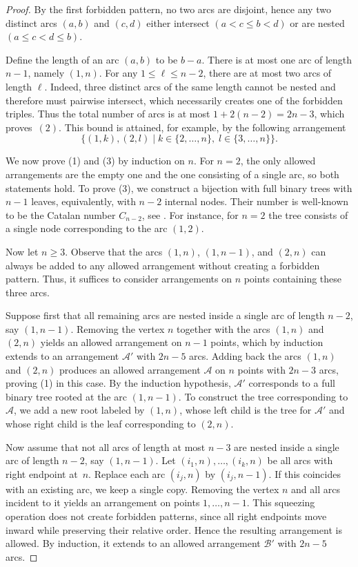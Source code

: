 \documentclass[12pt,a4paper]{amsart}
\theoremstyle{definition}
\begin{document}
\begin{proof}
By the first forbidden pattern, no two arcs are disjoint, hence any two distinct arcs $(a,b)$ and $(c,d)$ either intersect $(a<c\leq b < d)$ or are nested $(a\leq c <  d \leq b)$.  

Define the length of an arc \((a,b)\) to be \(b-a\).
There is at most one arc of length \(n-1\), namely \((1,n)\).  
For any \(1 \le \ell \le n-2\), there are at most two arcs of length \(\ell\). Indeed, three distinct arcs of the same length cannot be nested and therefore must pairwise intersect, which necessarily creates one of the forbidden triples.
Thus the total number of arcs is at most $1 + 2(n-2) = 2n-3$, which proves~$(2)$. This bound is attained, for example, by the following arrangement 
$$\{(1,k), (2,l) \mid k \in \{2,\dots,n\}, \; l \in \{3,\dots,n\}\}.$$

We now prove (1) and (3) by induction on \(n\).  
For \(n=2\), the only allowed arrangements are the empty one and the one consisting of a single arc, so both statements hold. To prove (3), we construct a bijection with full binary trees with \(n-1\) leaves, equivalently, with \(n-2\) internal nodes. Their number is well-known to be the Catalan number $C_{n-2}$, see \cite{Stanley15}. For instance, for \(n=2\) the tree consists of a single node corresponding to the arc \((1,2)\).

Now let \(n\ge 3\). Observe that the arcs \((1,n)\), \((1,n-1)\), and \((2,n)\) can always be added to any allowed arrangement without creating a forbidden pattern. Thus, it suffices to consider arrangements on \(n\) points containing these three arcs.

Suppose first that all remaining arcs are nested inside a single arc of length \(n-2\), say \((1,n-1)\). Removing the vertex \(n\) together with the arcs \((1,n)\) and \((2,n)\) yields an allowed arrangement on \(n-1\) points, which by induction extends to an arrangement $\mathcal{A}'$ with \(2n-5\) arcs. Adding back the arcs \((1,n)\) and \((2,n)\) produces an allowed arrangement \(\mathcal A\) on \(n\) points with \(2n-3\) arcs, proving (1) in this case. By the induction hypothesis, \(\mathcal A'\) corresponds to a full binary tree rooted at the arc \((1,n-1)\). To construct the tree corresponding to \(\mathcal A\), we add a new root labeled by \((1,n)\), whose left child is the tree for \(\mathcal A'\) and whose right child is the leaf corresponding to \((2,n)\).

Now assume that not all arcs of length at most \(n-3\) are nested inside a single arc of length \(n-2\), say \((1,n-1)\). Let \((i_1,n),\dots,(i_k,n)\) be all arcs with right endpoint at~\(n\).
Replace each arc \((i_j,n)\) by \((i_j,n-1)\). If this coincides with an existing arc, we keep a single copy. Removing the vertex \(n\) and all arcs incident to it yields an arrangement on points \(1,\dots,n-1\). This squeezing operation does not create forbidden patterns, since all right endpoints move inward while preserving their relative order. Hence the resulting arrangement is allowed.
By induction, it extends to an allowed arrangement \(\mathcal B'\) with \(2n-5\) arcs. 


\end{proof}
\end{document}
